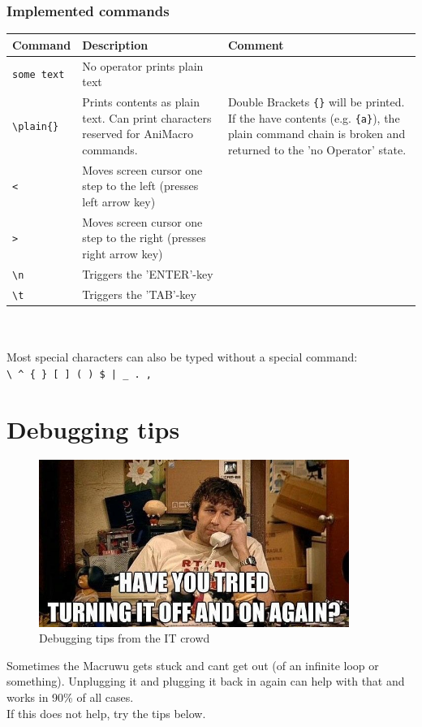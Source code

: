 \documentclass[english, 12pt]{scrartcl}
\begin{document}
	\subsubsection{Implemented commands}
	\begin{tabular}{|l|m{6.5cm}|m{6.5cm}}
		\hline
		\textbf{Command} & \textbf{Description} & \textbf{Comment}\\
		\hline
		\hline
		\verb=some text= & No operator prints plain text& \\
		\hline
		\verb=\plain{}= & Prints contents as plain text. Can print characters reserved for AniMacro commands. & Double Brackets \verb={}= will be printed. If the have contents (e.g. \verb={a}=), the plain command chain is broken and returned to the 'no Operator' state.\\
		\hline 
		\verb=<= & Moves screen cursor one step to the left (presses left arrow key) & \\
		\verb=>= & Moves screen cursor one step to the right (presses right arrow key) & \\
		\verb=\n= & Triggers the 'ENTER'-key & \\
		\verb=\t= & Triggers the 'TAB'-key & \\
		\hline
	\end{tabular}\\\\
	Most special characters can also be typed without a special command:\\
	\verb=\ ^ { } [ ] ( ) $ | _ . ,=
	\section{Debugging tips}
	\begin{figure}[H]
		\centering
		\includegraphics[width=0.9\textwidth]{debugging}
		\caption{Debugging tips from the IT crowd}
	\end{figure}
	Sometimes the Macruwu gets stuck and cant get out (of an infinite loop or something). Unplugging it and plugging it back in again can help with that and works in 90\% of all cases.\\
	If this does not help, try the tips below.
\end{document}
